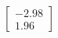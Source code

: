 \documentclass[preview]{standalone}
\begin{document}
\begin{align*}
\begin{bmatrix} -2.98 \\ 1.96 \end{bmatrix}
\end{align*}
\end{document}
